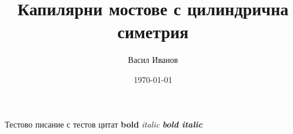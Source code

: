 \documentclass[12pt]{article}
\title{Капилярни мостове с цилиндрична симетрия}
\author{Васил Иванов }
\date{\today}
\begin{document}
    Тестово писание с тестов цитат
    \cite{directSynth}
    \textbf{bold}
    \textit{italic}
    \textbf{\textit{bold italic}}
    \printbibliography
\end{document}
